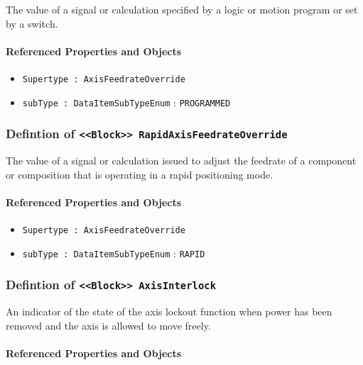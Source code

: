 \FloatBarrier

The value of a signal or calculation specified by a logic or motion program or set by a switch.

\FloatBarrier
\paragraph{Referenced Properties and Objects}

\begin{itemize}
\item \texttt{Supertype : AxisFeedrateOverride}

\item \texttt{subType : DataItemSubTypeEnum} : \texttt{PROGRAMMED}

\end{itemize}
\FloatBarrier
\subsubsection{Defintion of \texttt{<<Block>> RapidAxisFeedrateOverride}}
  \label{type:RapidAxisFeedrateOverride}

\FloatBarrier

The value of a signal or calculation issued to adjust the feedrate of a component or composition that is operating in a rapid positioning mode.

\FloatBarrier
\paragraph{Referenced Properties and Objects}

\begin{itemize}
\item \texttt{Supertype : AxisFeedrateOverride}

\item \texttt{subType : DataItemSubTypeEnum} : \texttt{RAPID}

\end{itemize}
\FloatBarrier
\subsubsection{Defintion of \texttt{<<Block>> AxisInterlock}}
  \label{type:AxisInterlock}

\FloatBarrier

An indicator of the state of the axis lockout function when power has been removed and the axis is allowed to move freely.

\FloatBarrier
\paragraph{Referenced Properties and Objects}

